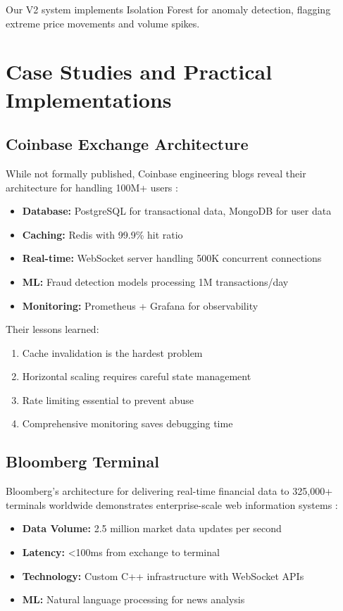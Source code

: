 \documentclass[conference]{IEEEtran}
\begin{document}
Our V2 system implements Isolation Forest for anomaly detection, flagging extreme price movements and volume spikes.

\section{Case Studies and Practical Implementations}

\subsection{Coinbase Exchange Architecture}

While not formally published, Coinbase engineering blogs reveal their architecture for handling 100M+ users \cite{coinbase2022}:

\begin{itemize}
    \item \textbf{Database:} PostgreSQL for transactional data, MongoDB for user data
    \item \textbf{Caching:} Redis with 99.9\% hit ratio
    \item \textbf{Real-time:} WebSocket server handling 500K concurrent connections
    \item \textbf{ML:} Fraud detection models processing 1M transactions/day
    \item \textbf{Monitoring:} Prometheus + Grafana for observability
\end{itemize}

Their lessons learned:
\begin{enumerate}
    \item Cache invalidation is the hardest problem
    \item Horizontal scaling requires careful state management
    \item Rate limiting essential to prevent abuse
    \item Comprehensive monitoring saves debugging time
\end{enumerate}

\subsection{Bloomberg Terminal}

Bloomberg's architecture for delivering real-time financial data to 325,000+ terminals worldwide demonstrates enterprise-scale web information systems \cite{bloomberg2021}:

\begin{itemize}
    \item \textbf{Data Volume:} 2.5 million market data updates per second
    \item \textbf{Latency:} <100ms from exchange to terminal
    \item \textbf{Technology:} Custom C++ infrastructure with WebSocket APIs
    \item \textbf{ML:} Natural language processing for news analysis
\end{itemize}
\end{document}
